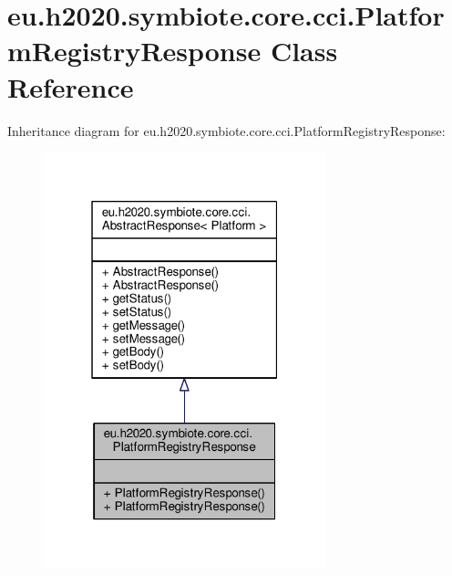 \hypertarget{classeu_1_1h2020_1_1symbiote_1_1core_1_1cci_1_1PlatformRegistryResponse}{}\section{eu.\+h2020.\+symbiote.\+core.\+cci.\+Platform\+Registry\+Response Class Reference}
\label{classeu_1_1h2020_1_1symbiote_1_1core_1_1cci_1_1PlatformRegistryResponse}


Inheritance diagram for eu.\+h2020.\+symbiote.\+core.\+cci.\+Platform\+Registry\+Response\+:
\nopagebreak
\begin{figure}[H]
\begin{center}
\leavevmode
\includegraphics[width=232pt]{classeu_1_1h2020_1_1symbiote_1_1core_1_1cci_1_1PlatformRegistryResponse__inherit__graph}
\end{center}
\end{figure}


